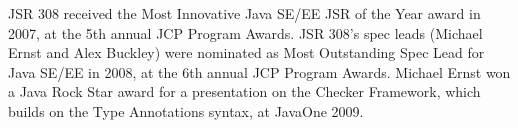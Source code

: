 \documentclass[10pt]{article}
\begin{document}
JSR 308 received
the Most Innovative Java SE/EE JSR of the Year award in 2007,
at the 5th annual JCP Program Awards.
JSR 308's spec leads (Michael
Ernst and Alex Buckley) were nominated as Most Outstanding Spec Lead for
Java SE/EE in 2008, at the 6th annual JCP Program Awards.
Michael Ernst won a Java Rock Star award for a presentation on the Checker
Framework, which builds on the Type Annotations syntax, at JavaOne 2009.







\end{document}
